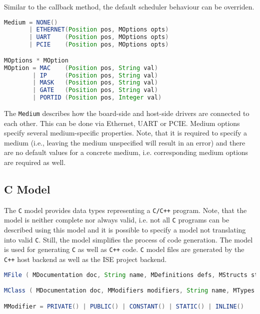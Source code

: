 \documentclass{report}
\begin{document}
Similar to the callback method, the default scheduler behaviour can be overriden.

\begin{lstlisting}[language=java, breaklines=true]
Medium = NONE()
       | ETHERNET(Position pos, MOptions opts)
       | UART    (Position pos, MOptions opts)
       | PCIE    (Position pos, MOptions opts)

MOptions * MOption
MOption = MAC    (Position pos, String val)
        | IP     (Position pos, String val)
        | MASK   (Position pos, String val)
        | GATE   (Position pos, String val)
        | PORTID (Position pos, Integer val)
\end{lstlisting}

The \texttt{Medium} describes how the board-side and host-side drivers are connected to each other. This can be done via Ethernet, UART or PCIE. Medium options specify several medium-specific properties. Note, that it is required to specify a medium (i.e., leaving the medium unspecified will result in an error) and there are no default values for a concrete medium, i.e. corresponding medium options are required as well.

\subsection{C Model}
\label{sec:cmodel}
The \texttt{C} model provides data types representing a \texttt{C/C++} program. Note, that the model is neither complete nor always valid, i.e. not all \texttt{C} programs can be described using this model and it is possible to specify a model not translating into valid \texttt{C}. Still, the model simplifies the process of code generation. The model is used for generating \texttt{C} as well as \texttt{C++} code. \texttt{C} model files are generated by the \texttt{C++} host backend as well as the ISE project backend.

\begin{lstlisting}[language=java, breaklines=true]
MFile ( MDocumentation doc, String name, MDefinitions defs, MStructs structs, MEnums enums, MAttributes attributes, MMethods methods, MClasses classes )

MClass ( MDocumentation doc, MModifiers modifiers, String name, MTypes extend, MStructs structs, MEnums enums, MAttributes attributes, MMethods methods, MClasses nested )

MModifier = PRIVATE() | PUBLIC() | CONSTANT() | STATIC() | INLINE()
\end{lstlisting}
\end{document}
